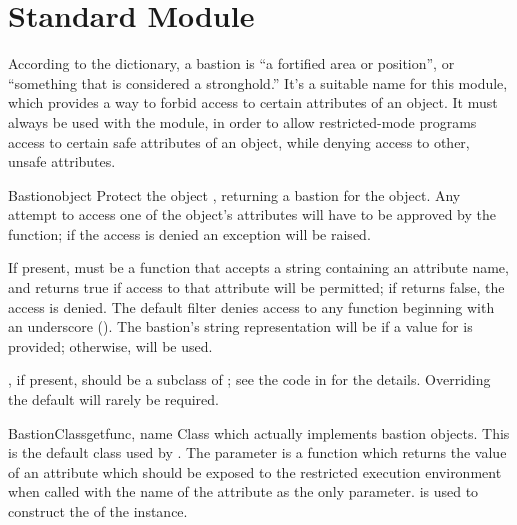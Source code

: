 \section{Standard Module }




According to the dictionary, a bastion is ``a fortified area or
position'', or ``something that is considered a stronghold.''  It's a
suitable name for this module, which provides a way to forbid access
to certain attributes of an object.  It must always be used with the
 module, in order to allow restricted-mode programs access
to certain safe attributes of an object, while denying access to
other, unsafe attributes.


\begin{funcdesc}{Bastion}{object}
Protect the object , returning a bastion for the
object.  Any attempt to access one of the object's attributes will
have to be approved by the  function; if the access is
denied an  exception will be raised.

If present,  must be a function that accepts a string
containing an attribute name, and returns true if access to that
attribute will be permitted; if  returns false, the access
is denied.  The default filter denies access to any function beginning
with an underscore (\samp{_}).  The bastion's string representation
will be  if a value for
 is provided; otherwise,  will be
used.

, if present, should be a subclass of ; 
see the code in  for the details.  Overriding the
default  will rarely be required.
\end{funcdesc}


\begin{classdesc}{BastionClass}{getfunc, name}
Class which actually implements bastion objects.  This is the default
class used by .  The  parameter is a
function which returns the value of an attribute which should be
exposed to the restricted execution environment when called with the
name of the attribute as the only parameter.   is used to
construct the  of the  instance.
\end{classdesc}
